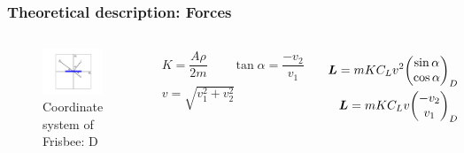 \documentclass{beamer}
\begin{document}

\begin{frame}

\frametitle{Theoretical description: Forces}

\begin{columns}[onlytextwidth]


\vspace{-10mm}
\begin{figure}[H]
	\centering
	  \includegraphics[width=\textwidth]{osi_frisbeeja.png}
	  \caption{Coordinate system of Frisbee: D}
\end{figure}

\vspace{-10mm}
\begin{gather*}
K = \dfrac{A \rho}{2 m} \qquad \tan \alpha = \dfrac{-v_2}{v_1}\\
v = \sqrt{v_1^2 + v_2^2}
\end{gather*}


\vspace{-10mm}

\begin{gather}
\begin{split}
\bm L = m K C_L v^2 \mqty(\sin \alpha \\ \cos \alpha)_D\\
\bm L = m K  C_L v \mqty(-v_2 \\ v_1\\)_D
\end{split}
\end{gather}


\end{columns}
\end{frame}
\end{document}
